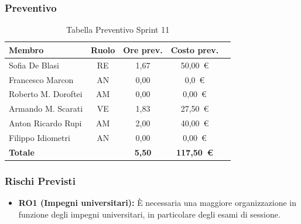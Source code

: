 \subsubsection{Preventivo}
\begin{table}[H]
    \centering
    \renewcommand{\arraystretch}{1.3}
    \begin{tabularx}{\textwidth}{|X|c|c|c|r|}
        \hline
        \textbf{Membro} & \textbf{Ruolo} & \textbf{Ore prev.} & \textbf{Costo prev.} \\
        \hline
        Sofia De Blasi       & RE & 1,67 & 50{,}00~\euro \\
        Francesco Marcon     & AN & 0,00 & 0{,}0~\euro \\
        Roberto M. Doroftei  & AM & 0,00 & 0{,}00~\euro \\
        Armando M. Scarati   & VE & 1,83 & 27{,}50~\euro \\
        Anton Ricardo Rupi   & AM & 2,00 & 40{,}00~\euro \\
        Filippo Idiometri    & AN & 0,00 & 0{,}00~\euro \\
        \hline
        \textbf{Totale}      &    & \textbf{5,50} & \textbf{117{,}50~\euro} \\
        \hline
    \end{tabularx}
    \caption{Tabella Preventivo Sprint 11} 
\end{table}

\subsubsection{Rischi Previsti}
\begin{itemize}
    \item \textbf{RO1 (Impegni universitari):} È necessaria una maggiore organizzazione in funzione degli impegni universitari, in particolare degli esami di sessione.
\end{itemize}

